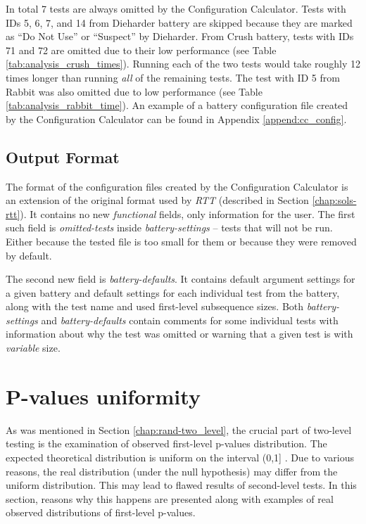 \documentclass[
  digital,     %
  oneside,     %
  nosansbold,  %
  nocolorbold, %
  nolof,         %
  nolot,         %
]{fithesis4}
\begin{document}
In total 7 tests are always omitted by the Configuration Calculator. Tests with IDs 5, 6, 7, and 14 from Dieharder battery are skipped because they are marked as ``Do Not Use'' or ``Suspect'' by Dieharder. From Crush battery, tests with IDs 71 and 72 are omitted due to their low performance (see Table \ref{tab:analysis_crush_times}). Running each of the two tests would take roughly 12 times longer than running \emph{all} of the remaining tests. The test with ID 5 from Rabbit was also omitted due to low performance (see Table \ref{tab:analysis_rabbit_time}). An example of a battery configuration file created by the Configuration Calculator can be found in Appendix \ref{append:cc_config}.


\subsection{Output Format}
The format of the configuration files created by the Configuration Calculator is an extension of the original format used by \emph{RTT} (described in Section \ref{chap:sols-rtt}). It contains no new \emph{functional} fields, only information for the user. The first such field is \emph{omitted-tests} inside \emph{battery-settings} -- tests that will not be run. Either because the tested file is too small for them or because they were removed by default.

The second new field is \emph{battery-defaults}. It contains default argument settings for a given battery and default settings for each individual test from the battery, along with the test name and used first-level subsequence sizes. Both \emph{battery-settings} and \emph{battery-defaults} contain comments for some individual tests with information about why the test was omitted or warning that a given test is with \emph{variable} size.



\section{P-values uniformity} \label{chap:analysis-uniform}
As was mentioned in Section \ref{chap:rand-two_level}, the crucial part of two-level testing is the examination of observed first-level p-values distribution. The expected theoretical distribution is uniform on the interval (0,1] \cite[p.~14]{bad_day}. Due to various reasons, the real distribution (under the null hypothesis) may differ from the uniform distribution. This may lead to flawed results of second-level tests. In this section, reasons why this happens are presented along with examples of real observed distributions of first-level p-values. 
\end{document}
